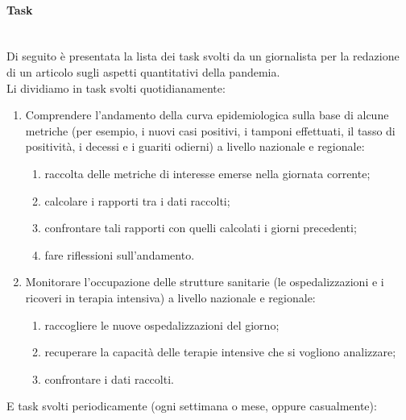 \paragraph{Task}\mbox{}\\
Di seguito è presentata la lista dei task svolti da un giornalista per la redazione di un articolo sugli aspetti quantitativi della pandemia.\\
Li dividiamo in task svolti quotidianamente:
\begin{enumerate}
    \item Comprendere l'andamento della curva epidemiologica sulla base di alcune metriche (per esempio, i nuovi casi positivi, i tamponi effettuati, il tasso di positività, i decessi e i guariti odierni) a livello nazionale e regionale:
    \begin{enumerate}[label=\alph*.]
        \item raccolta delle metriche di interesse emerse nella giornata corrente;
        \item calcolare i rapporti tra i dati raccolti;
        \item confrontare tali rapporti con quelli calcolati i giorni precedenti;
        \item fare riflessioni sull'andamento.
    \end{enumerate}
    \item Monitorare l'occupazione delle strutture sanitarie (le ospedalizzazioni e i ricoveri in terapia intensiva) a livello nazionale e regionale:
    \begin{enumerate}[label=\alph*.]
        \item raccogliere le nuove ospedalizzazioni del giorno;
        \item recuperare la capacità delle terapie intensive che si vogliono analizzare;
        \item confrontare i dati raccolti.
    \end{enumerate}
\end{enumerate}
E task svolti periodicamente (ogni settimana o mese, oppure casualmente):
